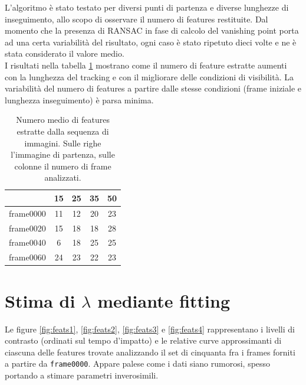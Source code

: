 \documentclass[12pt]{report}
\begin{document}
\noindent L'algoritmo \`e stato testato per diversi punti di partenza e diverse lunghezze di inseguimento, allo scopo di osservare il numero di features restituite. Dal momento che la presenza di RANSAC in fase di calcolo del vanishing point porta ad una certa variabilit\`a del risultato, ogni caso \`e stato ripetuto dieci volte e ne \`e stata considerato il valore medio.\\
\noindent I risultati nella tabella \ref{tabNum} mostrano come il numero di feature estratte aumenti con la lunghezza del tracking e con il migliorare delle condizioni di visibilit\`a. La variabilit\`a del numero di features a partire dalle stesse condizioni (frame iniziale e lunghezza inseguimento) \`e parsa minima.

\begin{table}[H]
\begin{center}
\begin{tabular}{|c|c|c|c|c|}
	\hline
	& 15 & 25 & 35 & 50 \\
	\hline
	frame0000 & 11 & 12 & 20 & 23\\
	\hline
	frame0020 & 15 & 18 & 18 & 28\\
	\hline
	frame0040 & 6 & 18 & 25 & 25\\
	\hline
	frame0060 & 24 & 23 & 22 & 23\\
	\hline
\end{tabular}
\caption{Numero medio di features estratte dalla sequenza di immagini. Sulle righe l'immagine di partenza, sulle colonne il numero di frame analizzati.}
\label{tabNum}
\end{center}
\end{table}




\newpage

\section{Stima di $\lambda$ mediante fitting}



\noindent Le figure \ref{fig:feats1}, \ref{fig:feats2}, \ref{fig:feats3} e \ref{fig:feats4} rappresentano i livelli di contrasto (ordinati sul tempo d'impatto) e le relative curve approssimanti di ciascuna delle features trovate analizzando il set di cinquanta fra i frames forniti a partire da \verb|frame0000|. Appare palese come i dati siano rumorosi, spesso portando a stimare parametri inverosimili.\\
\end{document}

